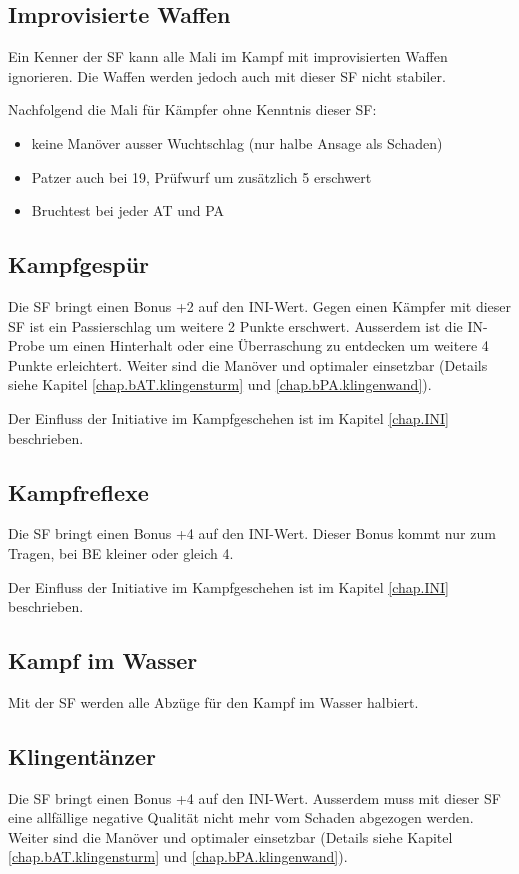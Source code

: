 \subsection{Improvisierte Waffen}
Ein Kenner der SF  kann alle Mali im Kampf
mit improvisierten Waffen ignorieren. Die Waffen werden jedoch auch mit dieser
SF nicht stabiler.

Nachfolgend die Mali für Kämpfer ohne Kenntnis dieser SF:

\begin{itemize}
    \item keine Manöver ausser Wuchtschlag (nur halbe Ansage als Schaden)
    \item Patzer auch bei 19, Prüfwurf um zusätzlich 5 erschwert
    \item Bruchtest bei jeder AT und PA
\end{itemize}

\subsection{Kampfgespür}
Die SF  bringt einen Bonus +2 auf den INI-Wert. Gegen
einen Kämpfer mit dieser SF ist ein Passierschlag um weitere 2 Punkte
erschwert. Ausserdem ist die IN-Probe um einen Hinterhalt oder eine
Überraschung zu entdecken um weitere 4 Punkte erleichtert. Weiter sind die
Manöver  und  optimaler
einsetzbar (Details siehe Kapitel \ref{chap.bAT.klingensturm} und
\ref{chap.bPA.klingenwand}).

Der Einfluss der Initiative im Kampfgeschehen ist im Kapitel \ref{chap.INI}
beschrieben.

\subsection{Kampfreflexe}
Die SF  bringt einen Bonus +4 auf den INI-Wert.
Dieser Bonus kommt nur zum Tragen, bei BE kleiner oder gleich 4.

Der Einfluss der Initiative im Kampfgeschehen ist im Kapitel \ref{chap.INI}
beschrieben.

\subsection{Kampf im Wasser}
Mit der SF  werden alle Abzüge für den Kampf im
Wasser halbiert.

\subsection{Klingentänzer}
Die SF  bringt einen Bonus +4 auf den INI-Wert.
Ausserdem muss mit dieser SF eine allfällige negative Qualität nicht mehr vom
Schaden abgezogen werden. Weiter sind die Manöver 
und  optimaler einsetzbar (Details siehe Kapitel
\ref{chap.bAT.klingensturm} und \ref{chap.bPA.klingenwand}).

